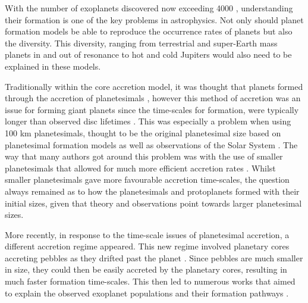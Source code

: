 \documentclass[a4paper,fleqn,usenatbib]{mnras}
\begin{document}
With the number of exoplanets discovered now exceeding 4000 \citep[e.g.][]{Winn15}, understanding their formation is one of the key problems in astrophysics.
Not only should planet formation models be able to reproduce the occurrence rates of planets but also the diversity.
This diversity, ranging from terrestrial and super-Earth mass planets in and out of resonance \citep{Anglada2016,Damasso20,GillonTrappist17} to hot and cold Jupiters \citep{MayorQueloz,Robertson12} would also need to be explained in these models.

Traditionally within the core accretion model, it was thought that planets formed through the accretion of planetesimals \citep{Pollack}, however this method of accretion was an issue for forming giant planets since the time-scales for formation, were typically longer than observed disc lifetimes \citep{Haisch01,Mamajek09,Ribas14}.
This was especially a problem when using 100 km planetesimals, thought to be the original planetesimal size based on planetesimal formation models \citep{Youdin05,Johansen07,JohansenYoudin2009,Bai10} as well as observations of the Solar System \citep{Morbidelli09,Delbo17}.
The way that many authors got around this problem was with the use of smaller planetesimals that allowed for much more efficient accretion rates \citep[e.g.][]{Alibert2006,Ida13,Mordasini15,ColemanNelson14,ColemanNelson16,ColemanNelson16b}.
Whilst smaller planetesimals gave more favourable accretion time-scales, the question always remained as to how the planetesimals and protoplanets formed with their initial sizes, given that theory and observations point towards larger planetesimal sizes.

More recently, in response to the time-scale issues of planetesimal accretion, a different accretion regime appeared.
This new regime involved planetary cores accreting pebbles as they drifted past the planet \citep{OrmelKlahr2010,Lambrechts12}.
Since pebbles are much smaller in size, they could then be easily accreted by the planetary cores, resulting in much faster formation time-scales.
This then led to numerous works that aimed to explain the observed exoplanet populations and their formation pathways \citep{Bitsch15,Lambrechts19,Bitsch19}.
\end{document}
